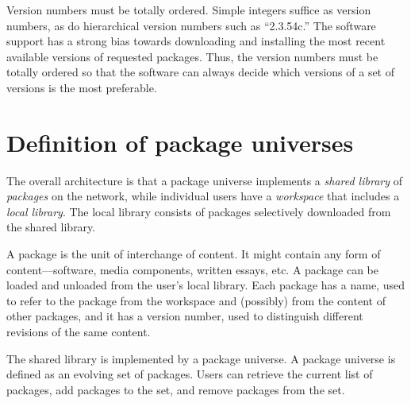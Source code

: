 \documentclass{article}
\begin{document}
Version numbers must be totally ordered.  Simple integers suffice as
version numbers, as do hierarchical version numbers such as
``2.3.54c.''  The software support has a strong bias towards
downloading and installing the most recent available versions of
requested packages.  Thus, the version numbers must be totally ordered
so that the software can always decide which versions of a set of
versions is the most preferable.



\section{Definition of package universes}

The overall architecture is that a package universe implements a
\emph{shared library} of \emph{packages} on the network, while
individual users have a \emph{workspace} that includes a \emph{local
library}.  The local library consists of packages selectively
downloaded from the shared library.

A package is the unit of interchange of content.  It might contain any
form of content---software, media components, written essays, etc.  A
package can be loaded and unloaded from the user's local library.
Each package has a name, used to refer to the package from the
workspace and (possibly) from the content of other packages, and it
has a version number, used to distinguish different revisions of the same
content.

The shared library is implemented by a package universe.  A package
universe is defined as an evolving set of packages.  Users can
retrieve the current list of packages, add packages to the set, and
remove packages from the set.
\end{document}
